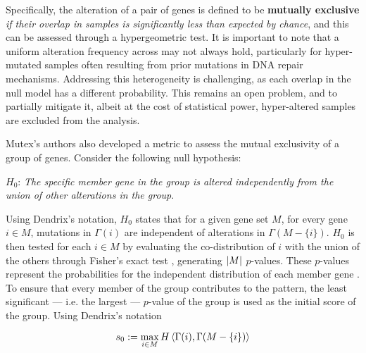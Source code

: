 Specifically, the alteration of a pair of genes is defined to be \textbf{mutually exclusive} \textit{if their overlap in samples is significantly less than expected by chance}, and this can be assessed through a hypergeometric test.  It is important to note that a uniform alteration frequency across may not always hold, particularly for hyper-mutated samples often resulting from prior mutations in DNA repair mechanisms. Addressing this heterogeneity is challenging, as each overlap in the null model has a different probability. This remains an open problem, and to partially mitigate it, albeit at the cost of statistical power, hyper-altered samples are excluded from the analysis. 

Mutex's authors also developed a metric to assess the mutual exclusivity of a group of genes. Consider the following null hypothesis:

\begin{displayquote}
    $H_0$: \textit{The specific member gene in the group is altered independently from the union of other alterations in the group}.
\end{displayquote}

Using Dendrix's notation, $H_0$ states that for a given gene set $M$, for every gene $i \in M$, mutations in $\Gamma(i)$ are independent of alterations in $\Gamma(M - \{i\})$. $H_0$ is then tested for each $i \in M$ by evaluating the co-distribution of $i$ with the union of the others through Fisher's exact test , generating $\left|M\right|$ $p$-values. These $p$-values represent the probabilities for the independent distribution of each member gene . To ensure that every member of the group contributes to the pattern, the least significant --- i.e. the largest --- $p$-value of the group is used as the initial score of the group. Using Dendrix's notation

\begin{equation}
    s_0 := \max_{i \in M} {H \left\langle\Gamma(i), \Gamma(M - \{i\})\right\rangle}
\end{equation}

